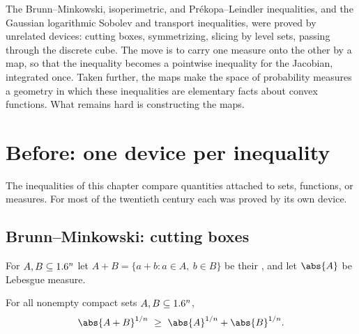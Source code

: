 \begin{refsection}

\newcommand{\transportH}[2]{H(#1\,|\,#2)}
\newcommand{\transportI}[2]{I(#1\,|\,#2)}
\newcommand{\transportW}{W_2}
\newcommand{\transportpf}{_{\#}}
\newcommand{\transportReg}{\mathcal{R}}

\begin{chaptersummary}
The Brunn--Minkowski, isoperimetric, and Pr\'ekopa--Leindler inequalities, and the Gaussian logarithmic Sobolev and transport inequalities, were proved by unrelated devices: cutting boxes, symmetrizing, slicing by level sets, passing through the discrete cube. The move is to carry one measure onto the other by a map, so that the inequality becomes a pointwise inequality for the Jacobian, integrated once. Taken further, the maps make the space of probability measures a geometry in which these inequalities are elementary facts about convex functions. What remains hard is constructing the maps.
\end{chaptersummary}

\section{Before: one device per inequality}\label{sec:transport:before}

The inequalities of this chapter compare quantities attached to sets, functions, or measures. For most of the twentieth century each was proved by its own device.

\subsection{Brunn--Minkowski: cutting boxes}\label{sec:transport:bmbefore}

For $A,B\subseteq1.6^n$ let $A+B=\{a+b:a\in A,\ b\in B\}$ be their , and let $\abs{A}$ be Lebesgue measure.

\begin{theorem}\label{thm:transport:bm}
For all nonempty compact sets $A,B\subseteq1.6^n$,
\begin{equation}\label{eq:transport:bm}
\abs{A+B}^{1/n}\ \ge\ \abs{A}^{1/n}+\abs{B}^{1/n}.
\end{equation}
\end{theorem}


\end{refsection}
